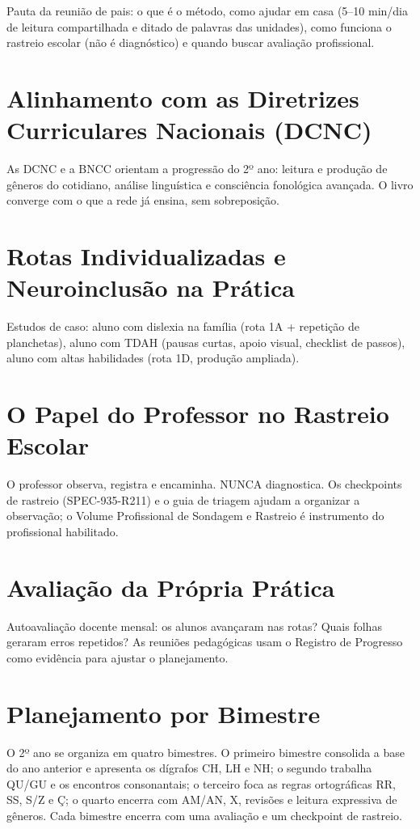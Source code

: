 Pauta da reunião de pais: o que é o método, como ajudar em casa (5–10 min/dia de leitura compartilhada e ditado de palavras das unidades), como funciona o rastreio escolar (não é diagnóstico) e quando buscar avaliação profissional.


\chapter{Alinhamento com as Diretrizes Curriculares Nacionais (DCNC)}

As DCNC e a BNCC orientam a progressão do 2º ano: leitura e produção de gêneros do cotidiano, análise linguística e consciência fonológica avançada. O livro converge com o que a rede já ensina, sem sobreposição.


\chapter{Rotas Individualizadas e Neuroinclusão na Prática}

Estudos de caso: aluno com dislexia na família (rota 1A + repetição de planchetas), aluno com TDAH (pausas curtas, apoio visual, checklist de passos), aluno com altas habilidades (rota 1D, produção ampliada).


\chapter{O Papel do Professor no Rastreio Escolar}

O professor observa, registra e encaminha. NUNCA diagnostica. Os checkpoints de rastreio (SPEC-935-R211) e o guia de triagem ajudam a organizar a observação; o Volume Profissional de Sondagem e Rastreio é instrumento do profissional habilitado.


\chapter{Avaliação da Própria Prática}

Autoavaliação docente mensal: os alunos avançaram nas rotas? Quais folhas geraram erros repetidos? As reuniões pedagógicas usam o Registro de Progresso como evidência para ajustar o planejamento.


\chapter{Planejamento por Bimestre}

O 2º ano se organiza em quatro bimestres. O primeiro bimestre consolida a base do ano anterior e apresenta os dígrafos CH, LH e NH; o segundo trabalha QU/GU e os encontros consonantais; o terceiro foca as regras ortográficas RR, SS, S/Z e Ç; o quarto encerra com AM/AN, X, revisões e leitura expressiva de gêneros. Cada bimestre encerra com uma avaliação e um checkpoint de rastreio.


